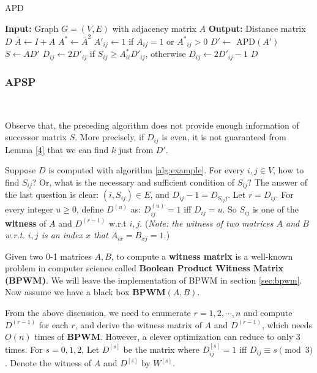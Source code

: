 \documentclass[11pt]{article}
\theoremstyle{plain}
\begin{document}
\begin{algorithm}
\caption{APD}
\label{alg:example}
\begin{algorithmic}[1]
    \STATE \textbf{Input:} Graph $G=(V,E)$ with adjacency matrix $A$
    \STATE \textbf{Output:} Distance matrix $D$
    \STATE $\bar A\leftarrow I+A$
    \STATE $A^*\leftarrow \bar A^2$
            \STATE $A'_{ij}\leftarrow 1$ if $A_{ij}=1$ or ${A^*}_{ij}>0$
        \ENDFOR
    \ENDFOR
    \STATE $D'\leftarrow$ APD$(A')$
    \STATE $S\leftarrow AD'$
            \STATE $D_{ij}\leftarrow 2D'_{ij}$ if $S_{ij}\ge A^*_{ii}D'_{ij}$, otherwise $D_{ij}\leftarrow 2D'_{ij}-1$
        \ENDFOR
    \ENDFOR
    \RETURN $D$
\end{algorithmic}
\end{algorithm}

\subsubsection{APSP}\

Observe that, the preceding algorithm does not provide enough information of successor matrix $S$. More precisely, if $D_{ij}$ is even, it is not guaranteed from Lemma \ref{4} that we can find $k$ just from $D'$.

Suppose $D$ is computed with algorithm \ref{alg:example}. For every $i,j\in V$, how to find $S_{ij}$? Or, what is the necessary and sufficient condition of $S_{ij}$? The answer of the last question is clear: $(i,S_{ij})\in E$, and $D_{ij}-1 = D_{S_{ij}j}$. Let $r=D_{ij}$. For every integer $u\ge 0$, define $D^{(u)}$ as: $D^{(u)}_{ij}=1$ iff $D_{ij}=u$. So $S_{ij}$ is one of the \textbf{witness} of $A$ and $D^{(r-1)}$ w.r.t $i,j$. (\emph{Note: the witness of two matrices $A$ and $B$ w.r.t. $i,j$ is an index $x$ that $A_{ix}=B_{xj}=1$.})

Given two 0-1 matrices $A,B$, to compute a \textbf{witness matrix} is a well-known problem in computer science called \textbf{Boolean Product Witness Matrix (BPWM)}. We will leave the implementation of BPWM in section \ref{sec:bpwm}. Now assume we have a black box $\mathbf{BPWM}(A,B)$.

From the above discussion, we need to enumerate $r=1,2,\cdots,n$ and compute $D^{(r-1)}$ for each $r$, and derive the witness matrix of $A$ and $D^{(r-1)}$, which needs $O(n)$ times of $\mathbf{BPWM}$. However, a clever optimization can reduce to only $3$ times. For $s=0,1,2$, Let $D^{[s]}$ be the matrix where $D^{[s]}_{ij}=1$ iff $D_{ij}\equiv s\pmod 3$. Denote the witness of $A$ and $D^{[s]}$ by $W^{[s]}$.
\end{document}
